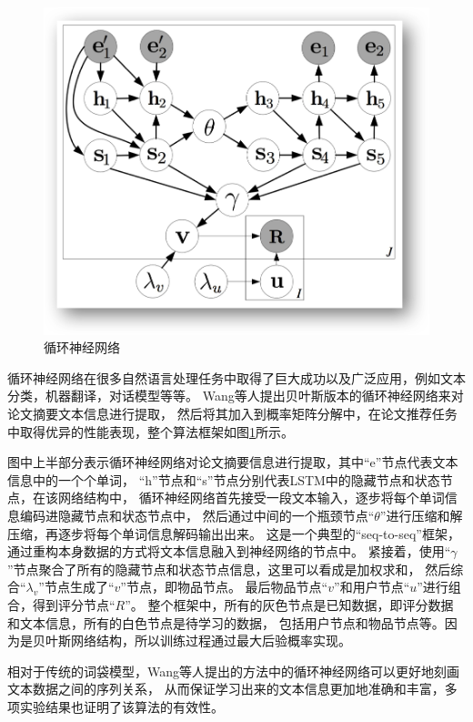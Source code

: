 \begin{figure}[htbp]
\centering
\includegraphics[scale=0.6]{images/pmf_rnn.png}
\caption{循环神经网络}
\label{fig:pmf_rnn}
\end{figure}

循环神经网络在很多自然语言处理任务中取得了巨大成功以及广泛应用，例如文本分类，机器翻译，对话模型等等。
Wang等人\parencite{wang2016collaborative}提出贝叶斯版本的循环神经网络来对论文摘要文本信息进行提取，
然后将其加入到概率矩阵分解中，在论文推荐任务中取得优异的性能表现，整个算法框架如图\ref{fig:pmf_rnn}所示。

图中上半部分表示循环神经网络对论文摘要信息进行提取，其中``e''节点代表文本信息中的一个个单词，
``h''节点和``s''节点分别代表LSTM中的隐藏节点和状态节点，在该网络结构中，
循环神经网络首先接受一段文本输入，逐步将每个单词信息编码进隐藏节点和状态节点中，
然后通过中间的一个瓶颈节点``$\theta$''进行压缩和解压缩，再逐步将每个单词信息解码输出出来。
这是一个典型的``seq-to-seq''框架，通过重构本身数据的方式将文本信息融入到神经网络的节点中。
紧接着，使用``$\gamma$''节点聚合了所有的隐藏节点和状态节点信息，这里可以看成是加权求和，
然后综合``$\lambda_v$''节点生成了``$v$''节点，即物品节点。
最后物品节点``$v$''和用户节点``$u$''进行组合，得到评分节点``$R$''。
整个框架中，所有的灰色节点是已知数据，即评分数据和文本信息，所有的白色节点是待学习的数据，
包括用户节点和物品节点等。因为是贝叶斯网络结构，所以训练过程通过最大后验概率实现。

相对于传统的词袋模型，Wang等人提出的方法中的循环神经网络可以更好地刻画文本数据之间的序列关系，
从而保证学习出来的文本信息更加地准确和丰富，多项实验结果也证明了该算法的有效性。




